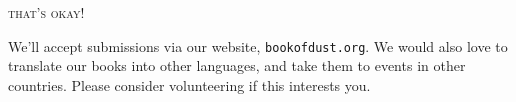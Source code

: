 
\begin{center}
\booktitlefont\textsc{that's okay!}
\end{center}
\begin{center}
\parbox{4.67in}{%
\begin{bookcomment}
We'll accept submissions via our website, \texttt{bookofdust.org}. We would also love to translate our books into other languages, and take them to events in other countries. Please consider volunteering if this interests you.
\end{bookcomment}
}
\end{center}